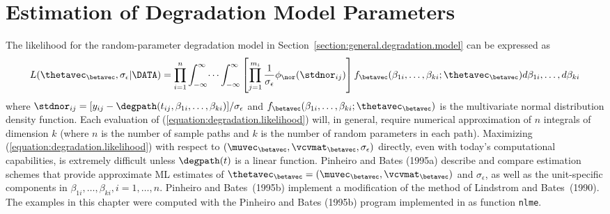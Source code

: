 \section{Estimation of Degradation Model Parameters}
\label{section:est.degrad.param}

The likelihood for the random-parameter degradation model in
Section~\ref{section:general.degradation.model} can be expressed as
\begin{equation}
\label{equation:degradation.likelihood}
L(\thetavec_{\betavec},\sigma_{\epsilon} | \DATA)=
\prod_{i=1}^{n} \int_{ - \infty}^{\infty} \dots \int_{ -
\infty}^{\infty}
\left[ \prod_{j=1}^{m_{i}} \frac{1}{\sigma_{\epsilon}}
\phi_{\nor}(\stdnor_{ij}) \right] f_{\betavec}(\beta_{1i}, \dots ,
\beta_{ki};\thetavec_{\betavec}) 
	d\beta_{1i}, \dots , d\beta_{ki}
\end{equation}
where $\stdnor_{ij}=[y_{ij}
-\degpath(t_{ij},\beta_{1i},\dots,\beta_{ki})]/\sigma_{\epsilon}$ and
$f_{\betavec}(\beta_{1i}, \dots ,
\beta_{ki};\thetavec_{\betavec}) $ is the
multivariate normal distribution density function.  Each evaluation of
(\ref{equation:degradation.likelihood}) will, in general, require
numerical approximation of $n$ integrals of dimension $k$ (where $n$ is
the number of sample paths and $k$ is the number of 
random parameters in each
path).  Maximizing (\ref{equation:degradation.likelihood}) with
respect to $(\muvec_{\betavec},\vcvmat_{\betavec},\sigma_{\epsilon})$
directly, even with today's computational capabilities, is extremely
difficult unless $\degpath(t)$ is a linear function.  Pinheiro and Bates
(1995a) describe and compare estimation schemes that provide
approximate ML estimates of
$\thetavec_{\betavec}=(\muvec_{\betavec},\vcvmat_{\betavec})$ and
$\sigma_{\epsilon}$, as well as the unit-specific components in
$\beta_{1i},\dots,\beta_{ki}, i=1, \dots, n$.  Pinheiro and Bates~(1995b)
implement a modification of the method of Lindstrom and Bates~(1990).
The examples in this chapter were computed with the Pinheiro and Bates
(1995b) program implemented in \splus as function {\tt nlme}. 

